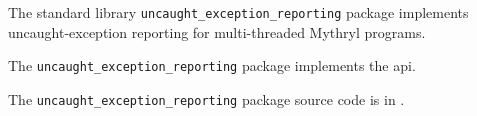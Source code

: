 
The standard library {\tt uncaught\_exception\_reporting} package implements uncaught-exception reporting for multi-threaded Mythryl programs.

The {\tt uncaught\_exception\_reporting} package implements the  api.

The {\tt uncaught\_exception\_reporting} package source code is in .

